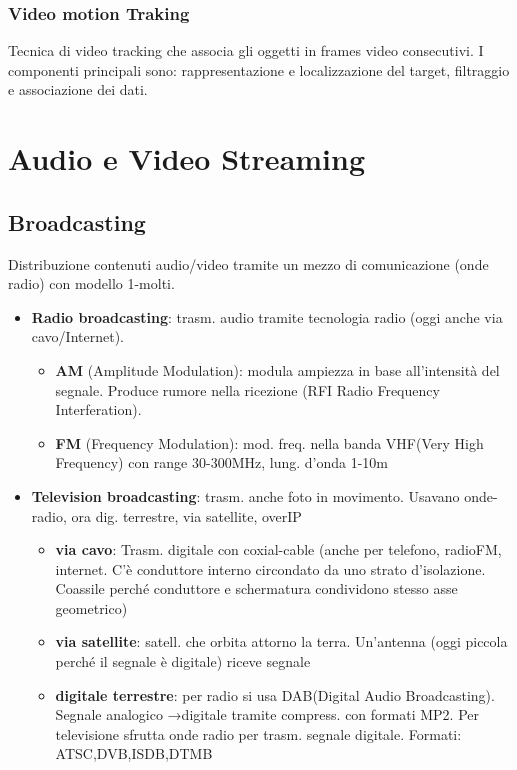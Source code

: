 \documentclass[8pt,a4paper]{article}
\begin{document}
\begin{multicols}{5}
    \subsubsection{Video motion Traking}
    Tecnica di video tracking che associa gli oggetti in frames video consecutivi. I 
    componenti principali sono: rappresentazione e localizzazione del target, 
    filtraggio e associazione dei dati.
    \section{Audio e Video Streaming}
    \subsection{Broadcasting}
    Distribuzione contenuti audio/video tramite un mezzo di comunicazione (onde radio) con modello 1-molti.
    \begin{itemize}
      \item \textbf{Radio broadcasting}: trasm. audio tramite tecnologia radio (oggi anche via cavo/Internet). 
      \begin{itemize}
        \item \textbf{AM} (Amplitude Modulation): modula ampiezza in base all’intensità del segnale. Produce rumore nella ricezione (RFI Radio Frequency Interferation).
        \item \textbf{FM} (Frequency Modulation): mod. freq. nella banda VHF(Very High Frequency) con range 30-300MHz, lung. d’onda 1-10m
      \end{itemize}
      \item \textbf{Television broadcasting}: trasm. anche foto in movimento. Usavano onde-radio, ora dig. terrestre, via satellite, overIP
      \begin{itemize}
        \item \textbf{via cavo}: Trasm. digitale con coxial-cable (anche per telefono, radioFM, internet. C’è conduttore interno circondato da uno strato d’isolazione. Coassile perché conduttore e schermatura condividono stesso asse geometrico)
        \item \textbf{via satellite}: satell. che orbita attorno la terra. Un’antenna (oggi piccola perché il segnale è digitale) riceve segnale
        \item \textbf{digitale terrestre}: per radio si usa DAB(Digital Audio Broadcasting). Segnale analogico →digitale tramite compress. con formati MP2. Per televisione sfrutta onde radio per trasm. segnale digitale. Formati: ATSC,DVB,ISDB,DTMB

\end{itemize}
\end{itemize}
\end{multicols}
\end{document}
